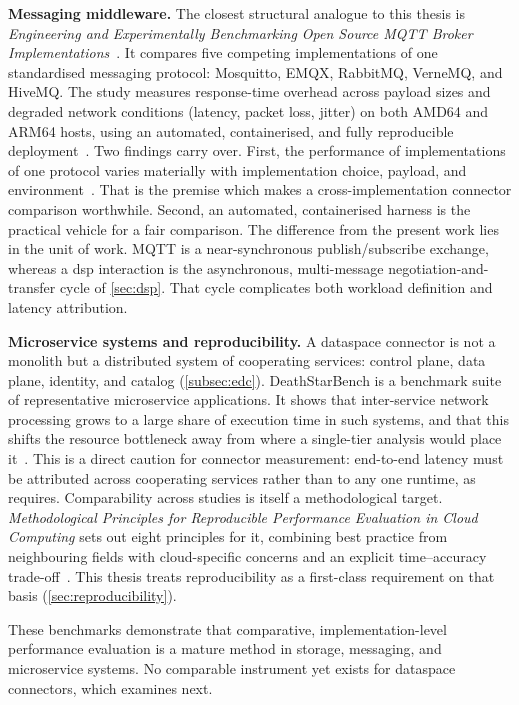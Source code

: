 \pagebreak

\textbf{Messaging middleware.} The closest structural analogue to this thesis is \emph{Engineering and Experimentally Benchmarking Open Source MQTT Broker Implementations}~\citep{dizdarevic2023mqttbrokers}. It compares five competing implementations of one standardised messaging protocol: Mosquitto, EMQX, RabbitMQ, VerneMQ, and HiveMQ. The study measures response-time overhead across payload sizes and degraded network conditions (latency, packet loss, jitter) on both AMD64 and ARM64 hosts, using an automated, containerised, and fully reproducible deployment~\citep{dizdarevic2023mqttbrokers}. Two findings carry over. First, the performance of implementations of one protocol varies materially with implementation choice, payload, and environment~\citep{dizdarevic2023mqttbrokers}. That is the premise which makes a cross-implementation connector comparison worthwhile. Second, an automated, containerised harness is the practical vehicle for a fair comparison. The difference from the present work lies in the unit of work. MQTT is a near-synchronous publish/subscribe exchange, whereas a \gls{dsp} interaction is the asynchronous, multi-message negotiation-and-transfer cycle of \cref{sec:dsp}. That cycle complicates both workload definition and latency attribution.

\textbf{Microservice systems and reproducibility.} A dataspace connector is not a monolith but a distributed system of cooperating services: control plane, data plane, identity, and catalog (\cref{subsec:edc}). DeathStarBench is a benchmark suite of representative microservice applications. It shows that inter-service network processing grows to a large share of execution time in such systems, and that this shifts the resource bottleneck away from where a single-tier analysis would place it~\citep{gan2019deathstarbench}. This is a direct caution for connector measurement: end-to-end latency must be attributed across cooperating services rather than to any one runtime, as  requires. Comparability across studies is itself a methodological target. \emph{Methodological Principles for Reproducible Performance Evaluation in Cloud Computing} sets out eight principles for it, combining best practice from neighbouring fields with cloud-specific concerns and an explicit time--accuracy trade-off~\citep{papadopoulos2021reproducible}. This thesis treats reproducibility as a first-class requirement on that basis (\cref{sec:reproducibility}).

These benchmarks demonstrate that comparative, implementation-level performance evaluation is a mature method in storage, messaging, and microservice systems. No comparable instrument yet exists for dataspace connectors, which  examines next.


